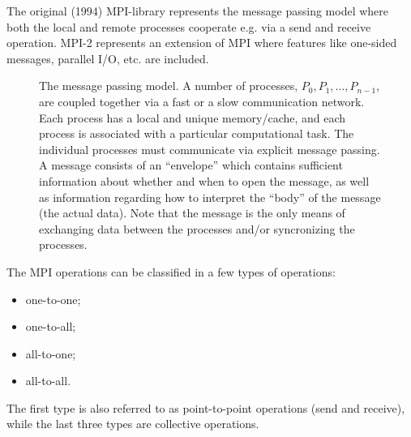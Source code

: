The original (1994) MPI-library represents the message passing model where both
the local and remote processes cooperate e.g. via a send and receive
operation. MPI-2 represents an extension of MPI where features like one-sided
messages, parallel I/O, etc. are included.

\begin{figure}
  \centering
  \caption{
    The message passing model. A number of processes, $P_0, P_1, \ldots,
    P_{n-1}$, are coupled together via a fast or a slow communication network.
    Each process has a local and unique memory/cache, and each process is
    associated with a particular computational task. The individual processes
    must communicate via explicit message passing. A message consists of an
    ``envelope'' which contains sufficient information about whether and when to
    open the message, as well as information regarding how to interpret the
    ``body'' of the message (the actual data). Note that the message is the only
    means of exchanging data between the processes and/or syncronizing the
    processes.
  }
  \label{fig:message_passing_model}
\end{figure}

The MPI operations can be classified in a few types of operations:
\begin{itemize}
\item one-to-one;
\item one-to-all;
\item all-to-one;
\item all-to-all.
\end{itemize}
The first type is also referred to as point-to-point operations (send and
receive), while the last three types are collective operations.

